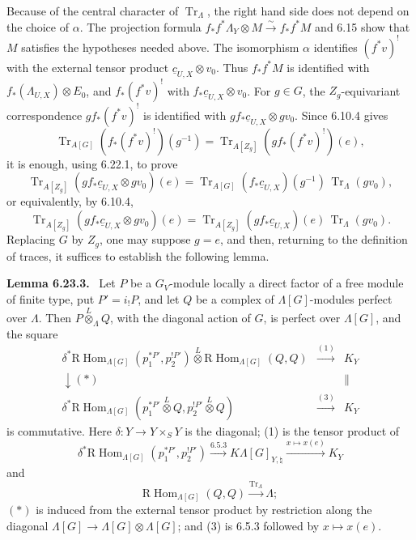 \documentclass[12pt]{article}
\newcommand{\RHom}{\mathrm R\!\operatorname{Hom}}
\newcommand{\Tr}{\operatorname{Tr}}
\newenvironment{statement}[1]{\par\medskip\noindent\textbf{#1.}\ }{\par\medskip}
\begin{document}
Because of the central character of $\Tr_\Lambda$, the right hand side does not
depend on the choice of $\alpha$. The projection formula
$f_*f^*\Lambda_Y\otimes M\xrightarrow{\sim}f_*f^*M$ and 6.15 show that $M$
satisfies the hypotheses needed above. The isomorphism $\alpha$ identifies
$(f^*v)^!$ with the external tensor product $\underline c_{U,X}\otimes v_0$.
Thus $f_*f^*M$ is identified with $f_*(\Lambda_{U,X})\otimes E_0$, and
$f_*(f^*v)^!$ with $f_*\underline c_{U,X}\otimes v_0$. For $g\in G$, the
$Z_g$-equivariant correspondence $g f_*(f^*v)^!$ is identified with
$g f_*\underline c_{U,X}\otimes g v_0$. Since 6.10.4 gives
\[
\Tr_{A[G]}(f_*(f^*v)^!)(g^{-1})=
\Tr_{A[Z_g]}(g f_*(f^*v)^!)(e),
\]
it is enough, using 6.22.1, to prove
\[
\Tr_{A[Z_g]}(g f_*\underline c_{U,X}\otimes gv_0)(e)=
\Tr_{A[G]}(f_*\underline c_{U,X})(g^{-1})\,\Tr_\Lambda(gv_0),
\]
or equivalently, by 6.10.4,
\begin{equation}\tag{6.23.2}
\Tr_{A[Z_g]}(g f_*\underline c_{U,X}\otimes gv_0)(e)=
\Tr_{A[Z_g]}(g f_*\underline c_{U,X})(e)\,\Tr_\Lambda(gv_0).
\end{equation}
Replacing $G$ by $Z_g$, one may suppose $g=e$, and then, returning to the definition
of traces, it suffices to establish the following lemma.

\begin{statement}{Lemma 6.23.3}
Let $P$ be a $G_V$-module locally a direct factor of a free module of finite type, put
$P'=i_!P$, and let $Q$ be a complex of $\Lambda[G]$-modules perfect over
$\Lambda$. Then $P\overset{L}{\otimes}_\Lambda Q$, with the diagonal action of $G$,
is perfect over $\Lambda[G]$, and the square
\[
\begin{array}{ccc}
\delta^*\RHom_{\Lambda[G]}(p_1^{*P'},p_2^{!P'})
\overset{L}{\otimes}\RHom_{\Lambda[G]}(Q,Q)&\xrightarrow{(1)}&K_Y\\[8pt]
\downarrow\scriptstyle(*) && \parallel\\[8pt]
\delta^*\RHom_{\Lambda[G]}(p_1^{*P'}\overset{L}{\otimes}Q,
 p_2^{!P'}\overset{L}{\otimes}Q)&\xrightarrow{(3)}&K_Y
\end{array}
\]
is commutative. Here $\delta:Y\to Y\times_S Y$ is the diagonal; (1) is the tensor
product of
\[
\delta^*\RHom_{\Lambda[G]}(p_1^{*P'},p_2^{!P'})\xrightarrow{6.5.3}
K\Lambda[G]_{Y,\natural}\xrightarrow{x\mapsto x(e)}K_Y
\]
and
\[
\RHom_{\Lambda[G]}(Q,Q)\xrightarrow{\Tr_\Lambda}\Lambda;
\]
$(*)$ is induced from the external tensor product by restriction along the diagonal
$\Lambda[G]\to\Lambda[G]\otimes\Lambda[G]$; and (3) is 6.5.3 followed by
$x\mapsto x(e)$.
\end{statement}
\end{document}
